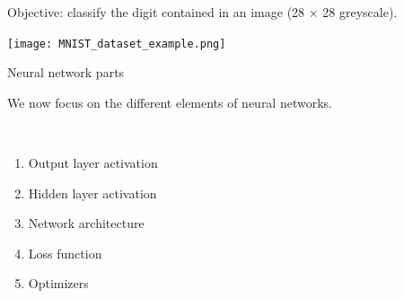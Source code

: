 \documentclass[
  10pt,
  ignorenonframetext,
  twocolumn]{beamer}
\providecommand{\tightlist}{%
  \setlength{\itemsep}{0pt}\setlength{\parskip}{0pt}}
\begin{document}
\begin{frame}
Objective: classify the digit contained in an image (28 \(\times\) 28
greyscale).

\texttt{[image: MNIST\_dataset\_example.png]}
\end{frame}

\begin{frame}
\begin{block}{Neural network parts}
\label{neural-network-parts}
\(~\)

We now focus on the different elements of neural networks.

\(~\)

\begin{enumerate}
[1)]
\tightlist
\item
  Output layer activation
\end{enumerate}

\vspace{2mm}

\begin{enumerate}
[1)]
\setcounter{enumi}{1}
\tightlist
\item
  Hidden layer activation
\end{enumerate}

\vspace{2mm}

\begin{enumerate}
[1)]
\setcounter{enumi}{2}
\tightlist
\item
  Network architecture
\end{enumerate}

\vspace{2mm}

\begin{enumerate}
[1)]
\setcounter{enumi}{3}
\tightlist
\item
  Loss function
\end{enumerate}

\vspace{2mm}

\begin{enumerate}
[1)]
\setcounter{enumi}{4}
\tightlist
\item
  Optimizers
\end{enumerate}
\end{block}
\end{frame}
\end{document}
